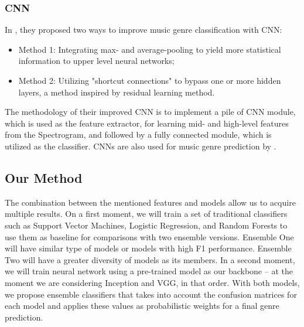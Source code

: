 \subsubsection{CNN}

In \citet{Zhang2016}, they proposed two ways to improve music genre classification with CNN:

\begin{itemize}
    \item Method 1: Integrating max- and average-pooling to yield more statistical information to upper level neural networks;
    \item Method 2: Utilizing "shortcut connections" to bypass one or more hidden layers, a method inspired by residual learning method.
\end{itemize}

The methodology of their improved CNN is to implement a pile of CNN module, which is used as the feature extractor, for learning mid- and high-level features from the Spectrogram, and followed by a fully connected module, which is utilized as the classifier. CNNs are also used for music genre prediction by \citet{Bahuleyan2018}.

\subsection{Our Method}

The combination between the mentioned features and models allow us to acquire multiple results. On a first moment, we will train a set of traditional classifiers such as Support Vector Machines, Logistic Regression, and Random Forests to use them as baseline for comparisons with two ensemble versions. Ensemble One will have similar type of models or models with high F1 performance. Ensemble Two will have a greater diversity of models as its members. In a second moment, we will train neural network using a pre-trained model as our backbone -- at the moment we are considering Inception and VGG, in that order. With both models, we propose ensemble classifiers that takes into account the confusion matrices for each model and applies these values as probabilistic weights for a final genre prediction.

